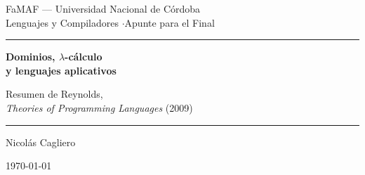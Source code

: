 \documentclass[11pt,a4paper]{report}
\begin{document}
\hypersetup{pageanchor=false}   %
\begin{titlepage}
\centering
\vspace*{\fill}
{\sffamily\small\color{accent!80!black}%
  FaMAF --- Universidad Nacional de Córdoba \\[2pt]
  Lenguajes y Compiladores \quad$\cdot$\quad Apunte para el Final\par}
\vspace{1.4cm}
{\color{accent}\rule{\linewidth}{1.2pt}}\par
\vspace{0.7cm}
{\sffamily\bfseries\Huge\color{accent}%
  Dominios, $\lambda$-cálculo\\[4pt] y lenguajes aplicativos\par}
\vspace{0.5cm}
{\sffamily\large\color{accent!85!black}%
  Resumen de Reynolds,\\[2pt]\emph{Theories of Programming Languages} (2009)\par}
\vspace{0.7cm}
{\color{accent}\rule{\linewidth}{1.2pt}}\par
\vspace{1.4cm}
{\sffamily\large Nicolás Cagliero\par}
\vspace{0.4cm}
{\sffamily\small\color{accent!70!black}\today\par}
\vspace*{\fill}
\end{titlepage}
\hypersetup{pageanchor=true}

\tableofcontents
\clearpage
{}





\end{document}
